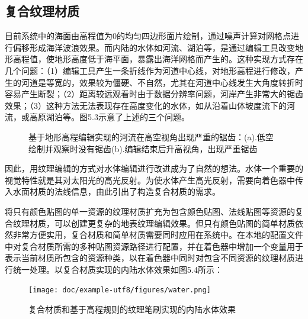\subsection{复合纹理材质}
目前系统中的海面由高程值为0的均匀四边形面片绘制，通过噪声计算对网格点进行偏移形成海洋波浪效果。而内陆的水体如河流、湖泊等，是通过编辑工具改变地形高程值，使地形高度低于海平面，暴露出海洋网格而产生的。这种实现方式存在几个问题：（1）编辑工具产生一条折线作为河道中心线，对地形高程进行修改，产生的河道是等宽的，效果较为僵硬、不自然，尤其在河道中心线发生大角度转折时容易产生断裂；（2）距离较远观看时由于数据分辨率问题，河岸产生非常大的锯齿效果；（3）这种方法无法表现存在高度变化的水体，如从沿着山体坡度流下的河流，或高原湖泊等。图5.3示意了上述的三个问题。
\begin{figure}[htb]
    \centering
    \caption{基于地形高程编辑实现的河流在高空视角出现严重的锯齿：(a).低空绘制并观察时没有锯齿(b).编辑结束后升高视角，出现严重锯齿}
\end{figure}
因此，用纹理编辑的方式对水体编辑进行改进成为了自然的想法。水体一个重要的视觉特性就是其对太阳光的高光反射。为使水体产生高光反射，需要向着色器中传入水面材质的法线信息，由此引出了构造复合材质的需求。\par
将只有颜色贴图的单一资源的纹理材质扩充为包含颜色贴图、法线贴图等资源的复合纹理材质，可以创建更复杂的地表纹理编辑效果。但只有颜色贴图的简单材质依然非常方便实用，复合材质和简单材质需要同时应用在系统中。在本地的配置文件中对复合材质所需的多种贴图资源路径进行配置，并在着色器中增加一个变量用于表示当前材质所包含的资源种类，以在着色器中同时对包含不同资源的纹理材质进行统一处理。以复合材质实现的内陆水体效果如图5.4所示：
\begin{figure}[htb]
    \centering
    \texttt{[image: doc/example-utf8/figures/water.png]}
    \caption{复合材质和基于高程规则的纹理笔刷实现的内陆水体效果}
\end{figure}
